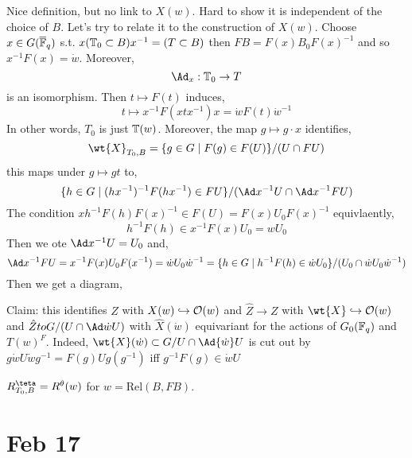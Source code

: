\documentclass[12pt]{article}
\begin{document}
Nice definition, but no link to $X(w)$. Hard to show it is independent of the choice of $B$. Let's try to relate it to the construction of $X(w)$. 
\skip
Choose $x \in G(\overline{\mathbb{F}}_q)$ s.t. $x(\mathbb{T}_0 \subset B)x^{-1} = (T \subset B)$ then $FB = F(x) B_0 F(x)^{-1}$ and so $x^{-1} F(x) = \dot{w}$. Moreover,
\[ \Ad_x :  \TT_0 \to T \]
is an isomorphism. Then $t \mapsto F(t)$ induces,
\[ t \mapsto x^{-1} F(x t x^{-1}) x = \dot{w} F(t) \dot{w}^{-1} \]
In other words, $T_0$ is just $\mathbb{T}(w)$. Moreover, the map $g \mapsto g \cdot x$ identifies,
\[ \wt{X}_{T_0, B} = \{ g \in G \mid F(g) \in F(U) \} / (U \cap FU) \]
this maps under $g \mapsto g t$ to,
\[ \{ h \in G \mid (h x^{-1})^{-1} F(h x^{-1}) \in FU \} / (\Ad x^{-1} U \cap \Ad x^{-1} F U) \]
The condition $x h^{-1} F(h) F(x)^{-1} \in F(U) = F(x) U_0 F(x)^{-1}$ equivlaently,
\[ h^{-1} F(h) \in x^{-1} F(x) U_0 = w U_0 \]
Then we ote $\Ad x^{-1} U = U_0$ and,
\[ \Ad x^{-1} FU = x^{-1} F(x) U_0 F(x^{-1}) = \dot{w} U_0 \dot{w}^{-1} = \{ h \in G \mid h^{-1} F(h) \in \dot{w}U_0 \} / (U_0 \cap \dot{w} U_0 \dot{w}^{-1}) \]
Then we get a diagram,
\begin{center}
\end{center}
Claim: this identifies $Z$ with $X(w) \hookrightarrow \mathcal{O}(w)$ and $\hat{Z} \to Z$ with $\wt{X} \embed \mathcal{O}(w)$ and $\hat{Z} to G / (U \cap \Ad \dot{w} U)$ with $\hat{X}(\dot{w})$ equivariant for the actions of $G_0(\mathbb{F}_q)$ and $T(w)^F$. Indeed, $\wt{X}(\dot{w}) \subset G / U \cap \Ad{\dot{w}} U$ is cut out by $g \dot{w} U \dot{w} g^{-1} = F(g) U g(g^{-1})$ iff $g^{-1} F(g) \in \dot{w} U$ 

\begin{cor}
$R^\teta_{T_0, B} = R^\theta(w)$ for $w = \mathrm{Rel}(B, FB)$.
\end{cor}

\section{Feb 17}
\end{document}
